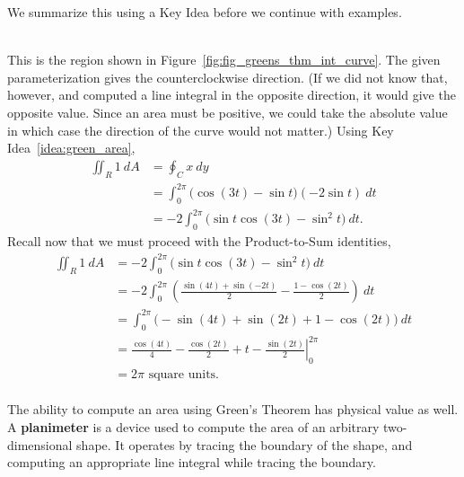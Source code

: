 We summarize this using a Key Idea before we continue with examples.

\\

 {This is the region shown in Figure~\ref{fig:fig_greens_thm_int_curve}.  The given parameterization gives the counterclockwise direction.  (If we did not know that, however, and computed a line integral in the opposite direction, it would give the opposite value.  Since an area must be positive, we could take the absolute value in which case the direction of the curve would not matter.)  Using Key Idea~\ref{idea:green_area},
\begin{align*}
\iint_R 1\ dA &= \oint_C x\: dy\\
&= \int_0^{2\pi} \big( \cos(3t) - \sin t \big) (-2\sin t)\ dt\\
&=-2 \int_0^{2\pi} \big( \sin t \cos(3t) - \sin^2 t \big)\ dt.
\end{align*}
Recall now that we must proceed with the Product-to-Sum identities,
\begin{align*}
\iint_R 1\ dA &= -2 \int_0^{2\pi} \big( \sin t \cos(3t) - \sin^2 t \big)\ dt\\
&=-2 \int_0^{2\pi} \left(  \frac{\sin(4t) + \sin(-2t)}{2} - \frac{1-\cos(2t)}{2}   \right)\ dt\\
&= \int_0^{2\pi} \big(  -\sin(4t) +\sin (2t) + 1 - \cos(2t)  \big)\ dt\\
&= \left. \frac{\cos(4t)}{4} - \frac{\cos(2t)}{2} + t - \frac{\sin(2t)}{2}\right|_0^{2\pi}\\
&=2\pi \text{ square units.}
\end{align*}
}\\

The ability to compute an area using Green's Theorem has physical value as well.  A \textbf{planimeter} is a device used to compute the area of an arbitrary two-dimensional shape.  It operates by tracing the boundary of the shape, and computing an appropriate line integral while tracing the boundary.

